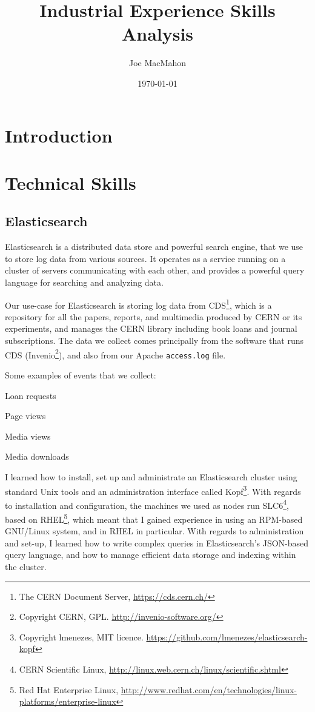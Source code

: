 \documentclass[a4paper,11pt]{article} %
\title{Industrial Experience Skills Analysis}
\author{Joe MacMahon}
\date{\today}
\begin{document}
\maketitle

\section{Introduction}
\label{sec:intro}

\section{Technical Skills}
\label{sec:technical}

\subsection{Elasticsearch}
\label{sec:technical.elasticsearch}

Elasticsearch is a distributed data store and powerful search engine, that we use to store log data from various sources.  It operates as a service running on a cluster of servers communicating with each other, and provides a powerful query language for searching and analyzing data.

Our use-case for Elasticsearch is storing log data from CDS\footnote{The CERN Document Server, \url{https://cds.cern.ch/}}, which is a repository for all the papers, reports, and multimedia produced by CERN or its experiments, and manages the CERN library including book loans and journal subscriptions.  The data we collect comes principally from the software that runs CDS (Invenio\footnote{Copyright CERN, GPL.  \url{http://invenio-software.org/}}), and also from our Apache \texttt{access.log} file.

Some examples of events that we collect:
\begin{itemize*}
\item Loan requests
\item Page views
\item Media views
\item Media downloads
\end{itemize*}

I learned how to install, set up and administrate an Elasticsearch cluster using standard Unix tools and an administration interface called Kopf\footnote{Copyright lmenezes, MIT licence.  \url{https://github.com/lmenezes/elasticsearch-kopf}}.  With regards to installation and configuration, the machines we used as nodes run SLC6\footnote{CERN Scientific Linux, \url{http://linux.web.cern.ch/linux/scientific.shtml}}, based on RHEL\footnote{Red Hat Enterprise Linux, \url{http://www.redhat.com/en/technologies/linux-platforms/enterprise-linux}}, which meant that I gained experience in using an RPM-based GNU/Linux system, and in RHEL in particular.  With regards to administration and set-up, I learned how to write complex queries in Elasticsearch's JSON-based query language, and how to manage efficient data storage and indexing within the cluster.
\end{document}
